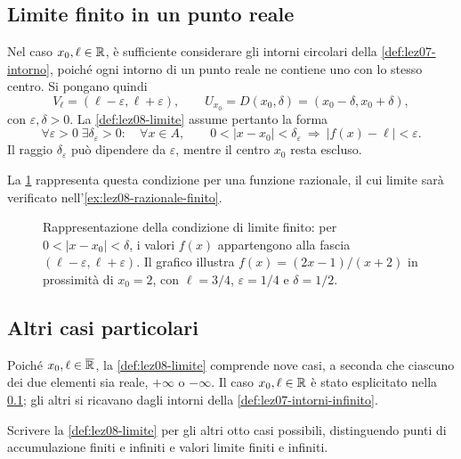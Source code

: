 \subsection{Limite finito in un punto reale}
\label{sec:lez08-limite-finito}

Nel caso \(x_0,\ell\in\mathbb{R}\), è sufficiente considerare
gli intorni circolari della \cref{def:lez07-intorno},
poiché ogni intorno di un punto reale ne contiene uno
con lo stesso centro. Si pongano quindi
\[
  V_\ell=(\ell-\varepsilon,\ell+\varepsilon),
  \qquad
  U_{x_0}=D(x_0,\delta)=(x_0-\delta,x_0+\delta),
\]
con \(\varepsilon,\delta>0\). La \cref{def:lez08-limite}
assume pertanto la forma
\[
  \forall\varepsilon>0\;\exists\delta_\varepsilon>0:
  \quad\forall x\in A,\qquad
  0<|x-x_0|<\delta_\varepsilon
  \ \Longrightarrow\ |f(x)-\ell|<\varepsilon.
\]
Il raggio \(\delta_\varepsilon\) può dipendere da
\(\varepsilon\), mentre il centro \(x_0\) resta escluso.

La \cref{fig:lez08-limite-finito} rappresenta questa condizione
per una funzione razionale, il cui limite sarà verificato
nell'\cref{ex:lez08-razionale-finito}.

\begin{figure}[htbp]
  \centering
  
  \caption{Rappresentazione della condizione di limite finito:
  per \(0<|x-x_0|<\delta\), i valori \(f(x)\) appartengono
  alla fascia \((\ell-\varepsilon,\ell+\varepsilon)\).
  Il grafico illustra \(f(x)=(2x-1)/(x+2)\) in prossimità
  di \(x_0=2\), con \(\ell=3/4\), \(\varepsilon=1/4\) e
  \(\delta=1/2\).}
  \label{fig:lez08-limite-finito}
\end{figure}

\subsection{Altri casi particolari}
\label{sec:lez08-limite-casi}

Poiché \(x_0,\ell\in\overline{\mathbb{R}}\), la
\cref{def:lez08-limite} comprende nove casi, a seconda che
ciascuno dei due elementi sia reale, \(+\infty\) o
\(-\infty\). Il caso \(x_0,\ell\in\mathbb{R}\) è stato
esplicitato nella \cref{sec:lez08-limite-finito};
gli altri si ricavano dagli intorni della
\cref{def:lez07-intorni-infinito}.

\begin{exercise}
\label{ex:lez08-casi-limite}
Scrivere la \cref{def:lez08-limite} per gli altri otto casi
possibili, distinguendo punti di accumulazione finiti e
infiniti e valori limite finiti e infiniti.
\end{exercise}


